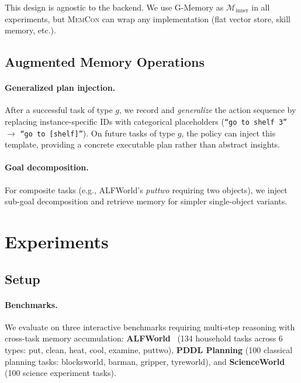 \documentclass{article} %
\theoremstyle{plain}
\theoremstyle{definition}
\theoremstyle{remark}
\newcommand{\ours}{\textsc{MemCon}\xspace}
\begin{document}
This design is agnostic to the backend. We use G-Memory as $\mathcal{M}_{\text{inner}}$ in all experiments, but \ours can wrap any implementation (flat vector store, skill memory, etc.).


\subsection{Augmented Memory Operations}

\paragraph{Generalized plan injection.}
After a successful task of type $g$, we record and \emph{generalize} the action sequence by replacing instance-specific IDs with categorical placeholders (\texttt{``go to shelf 3''} $\to$ \texttt{``go to [shelf]''}).
On future tasks of type $g$, the policy can inject this template, providing a concrete executable plan rather than abstract insights.

\paragraph{Goal decomposition.}
For composite tasks (e.g., ALFWorld's \textit{puttwo} requiring two objects), we inject sub-goal decomposition and retrieve memory for simpler single-object variants.


\section{Experiments}
\label{sec:experiments}

\subsection{Setup}

\paragraph{Benchmarks.}
We evaluate on three interactive benchmarks requiring multi-step reasoning with cross-task memory accumulation:
\textbf{ALFWorld}~\citep{shridhar2021alfworld} (134 household tasks across 6 types: put, clean, heat, cool, examine, puttwo),
\textbf{PDDL Planning} (100 classical planning tasks: blocksworld, barman, gripper, tyreworld), and
\textbf{ScienceWorld}~\citep{wang2022scienceworld} (100 science experiment tasks).
\end{document}
